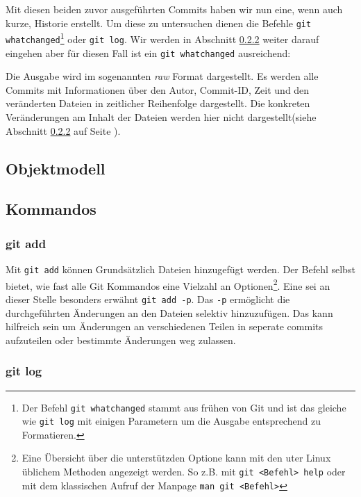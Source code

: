Mit diesen beiden zuvor ausgeführten Commits haben wir nun eine, wenn auch
kurze, Historie erstellt. Um diese zu untersuchen dienen die Befehle
\texttt{git whatchanged}\footnote{Der Befehl \texttt{git whatchanged} stammt
aus frühen von Git und ist das gleiche wie \texttt{git log} mit einigen
Parametern um die Ausgabe entsprechend zu Formatieren.} oder \texttt{git log}.
Wir werden in Abschnitt \ref{sec:gitlog} weiter darauf eingehen aber für diesen
Fall ist ein \texttt{git whatchanged} ausreichend:



Die Ausgabe wird im sogenannten \textit{raw} Format dargestellt. Es werden alle
Commits mit Informationen über den Autor, Commit-ID, Zeit und den veränderten
Dateien in zeitlicher Reihenfolge dargestellt. Die konkreten Veränderungen am
Inhalt der Dateien werden hier nicht dargestellt(siehe Abschnitt
\ref{sec:gitlog} auf Seite \pageref{sec:gitlog}).

\subsection{Objektmodell}
\subsection{Kommandos}\label{sec:commands}

\subsubsection{git add}\label{sec:gitadd}
Mit \texttt{git add} können Grundsätzlich Dateien hinzugefügt werden. Der
Befehl selbst bietet, wie fast alle Git Kommandos eine Vielzahl an
Optionen\footnote{Eine Übersicht über die unterstützden Optione kann mit den
uter Linux üblichem Methoden angezeigt werden. So z.B. mit \texttt{git <Befehl>
help} oder mit dem klassischen Aufruf der Manpage \texttt{man git <Befehl>}}.
Eine sei an dieser Stelle besonders erwähnt \texttt{git add -p}. Das
\texttt{-p} ermöglicht die durchgeführten Änderungen an den Dateien selektiv
hinzuzufügen. Das kann hilfreich sein um Änderungen an verschiedenen Teilen in
seperate \glspl{commit} aufzuteilen oder bestimmte Änderungen weg zulassen.

\subsubsection{git log}\label{sec:gitlog}
